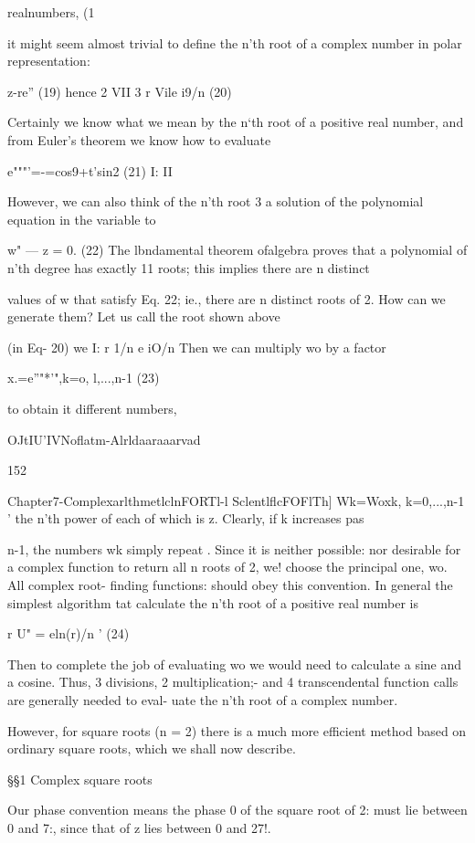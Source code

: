 {realnumbers,
(1%

it might seem almost trivial to deﬁne the n’th root of a complex
number in polar representation:

z-re” (19)
hence
2 VII 3 r Vile i9/n (20)

Certainly we know what we mean by the n‘th root of a positive
real number, and from Euler’s theorem we know how to evaluate

e"""'=-=cos9+t'sin2 (21)
I: II

However, we can also think of the n'th root 3 a solution of the
polynomial equation in the variable to

w" — z = 0. (22)
The lbndamental theorem ofalgebra proves that a polynomial of
n'th degree has exactly 11 roots; this implies there are n distinct

values of w that satisfy Eq. 22; ie., there are n distinct roots of 2.
How can we generate them? Let us call the root shown above

(in Eq- 20)
we I: r 1/n e iO/n
Then we can multiply wo by a factor

x.=e”"*’",k=o, l,...,n-1 (23)

to obtain it different numbers,

OJtIU'IVNoﬂatm-Alrldaaraaarvad

152

Chapter7-ComplexarlthmetlclnFORTl-l SclentlﬂcFOFlTh]
Wk=Woxk, k=0,...,n-1 '
the n’th power of each of which is z. Clearly, if k increases pas

n-1, the numbers wk simply repeat . Since it is neither possible:
nor desirable for a complex function to return all n roots of 2, we!
choose the principal one, wo. All complex root- ﬁnding functions:
should obey this convention. In general the simplest algorithm tat
calculate the n’th root of a positive real number is

r U" = eln(r)/n ' (24)

Then to complete the job of evaluating wo we would need to
calculate a sine and a cosine. Thus, 3 divisions, 2 multiplication;-
and 4 transcendental function calls are generally needed to eval-
uate the n'th root of a complex number.

However, for square roots (n = 2) there is a much more efficient
method based on ordinary square roots, which we shall now
describe.

§§1 Complex square roots

Our phase convention means the phase 0 of the square root of 2:
must lie between 0 and 7:, since that of z lies between 0 and 27!.

}
